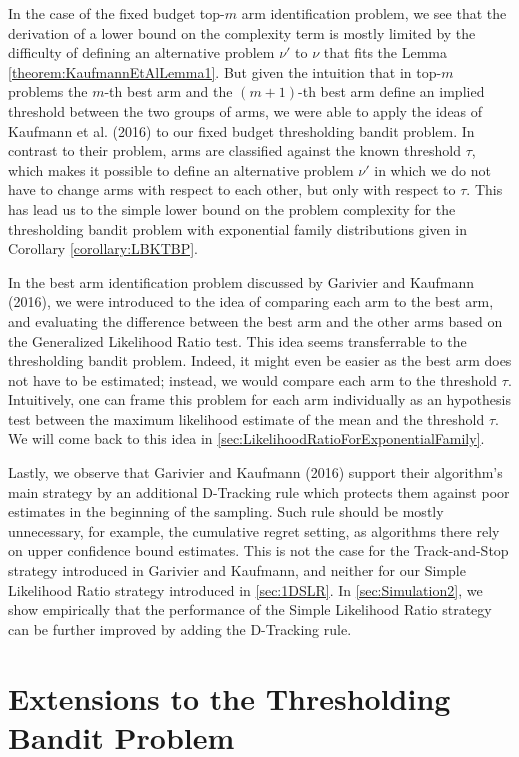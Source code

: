 \documentclass[11pt,]{article}
\begin{document}
In the case of the fixed budget top-\(m\) arm identification problem, we
see that the derivation of a lower bound on the complexity term is
mostly limited by the difficulty of defining an alternative problem
\(\nu'\) to \(\nu\) that fits the Lemma
\ref{theorem:KaufmannEtAlLemma1}. But given the intuition that in
top-\(m\) problems the \(m\)-th best arm and the \((m+1)\)-th best arm
define an implied threshold between the two groups of arms, we were able
to apply the ideas of Kaufmann et al. (2016) to our fixed budget
thresholding bandit problem. In contrast to their problem, arms are
classified against the known threshold \(\tau\), which makes it possible
to define an alternative problem \(\nu'\) in which we do not have to
change arms with respect to each other, but only with respect to
\(\tau\). This has lead us to the simple lower bound on the problem
complexity for the thresholding bandit problem with exponential family
distributions given in Corollary \ref{corollary:LBKTBP}.

In the best arm identification problem discussed by Garivier and
Kaufmann (2016), we were introduced to the idea of comparing each arm to
the best arm, and evaluating the difference between the best arm and the
other arms based on the Generalized Likelihood Ratio test. This idea
seems transferrable to the thresholding bandit problem. Indeed, it might
even be easier as the best arm does not have to be estimated; instead,
we would compare each arm to the threshold \(\tau\). Intuitively, one
can frame this problem for each arm individually as an hypothesis test
between the maximum likelihood estimate of the mean and the threshold
\(\tau\). We will come back to this idea in
\autoref{sec:LikelihoodRatioForExponentialFamily}.

Lastly, we observe that Garivier and Kaufmann (2016) support their
algorithm's main strategy by an additional D-Tracking rule which
protects them against poor estimates in the beginning of the sampling.
Such rule should be mostly unnecessary, for example, the cumulative
regret setting, as algorithms there rely on upper confidence bound
estimates. This is not the case for the Track-and-Stop strategy
introduced in Garivier and Kaufmann, and neither for our Simple
Likelihood Ratio strategy introduced in \autoref{sec:1DSLR}. In
\autoref{sec:Simulation2}, we show empirically that the performance of
the Simple Likelihood Ratio strategy can be further improved by adding
the D-Tracking rule.

\newpage

\section{\texorpdfstring{Extensions to the Thresholding Bandit Problem
\label{chap:Extensions}}{Extensions to the Thresholding Bandit Problem }}\label{extensions-to-the-thresholding-bandit-problem}
\end{document}
